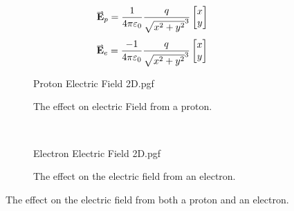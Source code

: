 \documentclass[main.tex]{subfiles}
\begin{document}
                \begin{equation}
                    \vect{E}_p = \frac{1}{4\pi\varepsilon_0}\frac{q}{\sqrt{x^2 + y^2}^3}\Matrix{x\\y}
                    \label{eq: Proton Electric Field}
                \end{equation}
                \begin{equation}
                    \vect{E}_e = \frac{-1}{4\pi\varepsilon_0}\frac{q}{\sqrt{x^2 + y^2}^3}\Matrix{x\\y}
                    \label{eq: Electron Electric Field}
                \end{equation}

                \begin{figure}[!h]
                    \vspace{-1em}
                    \centering
                    \begin{subfigure}[h]{0.48\textwidth}
                        \centering
                        \vspace*{-4mm}
                        \scalebox{0.7}
                        {
                            \begin{adjustbox}{clip,trim=40mm 15mm 25mm 10mm}
                                {{Proton Electric Field 2D.pgf}}
                            \end{adjustbox}
                        }
                        \caption{The effect on electric Field from a proton.}
                        \label{subfig: Proton Field 2D}
                    \end{subfigure}
                    ~
                    \hfill
                    \begin{subfigure}[h]{0.48\textwidth}
                        
                        \centering
                        \scalebox{0.7}
                        {
                            \begin{adjustbox}{clip,trim=40mm 15mm 25mm 7mm}
                                {{Electron Electric Field 2D.pgf}}
                            \end{adjustbox}
                        }
                        \caption{The effect on the electric field from an electron.}
                        \label{subfig: Electron Field 2D}
                    \end{subfigure}

                    \vspace{-3mm}
    
                    \caption{The effect on the electric field from both a proton and an electron.}
                    \label{fig: Proton and Electon E Fields 2D}
                \end{figure}
                \FloatBarrier
\end{document}
